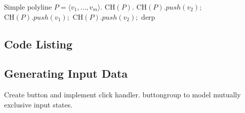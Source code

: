\begin{mdframed}[linecolor=white, backgroundcolor=algback, frametitle={Algorithm
Melkman}] \begin{algorithmic}[1]    
    \Require Simple polyline $P = \langle v_1, \ldots, v_m \rangle$.
    \Ensure $\text{CH}(P)$.
    \vspace{0.75em}
    \State $\text{CH}(P).push(v_2);$ $\text{CH}(P).push(v_1);$
    $\text{CH}(P).push(v_2);$ 
    	\State derp 
    \EndFor
    \EndProcedure
\end{algorithmic}
\end{mdframed} 


% 
% 

\subsection{Code Listing}



\subsection{Generating Input Data}

Create button and implement click handler. buttongroup to model mutually
exclusive input states.

